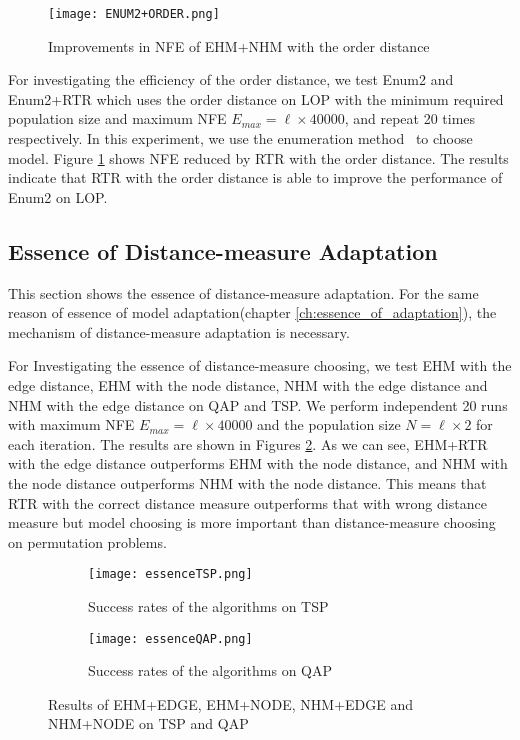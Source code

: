 \begin{figure}[htbp] 
        \centering
        \texttt{[image: ENUM2+ORDER.png]}
        \caption{ Improvements in NFE of EHM+NHM with the order distance } 
        \label{fig:enum2_imp}
\end{figure}


For investigating the efficiency of the order distance, we test Enum2 and Enum2+RTR which uses the order distance on LOP with the minimum required population size and maximum NFE $E_{max} = \ell\times 40000$, and repeat 20 times respectively. In this experiment, we use the enumeration method~\cite{riohsu2014} to choose model. Figure \ref{fig:enum2_imp} shows NFE reduced by RTR with the order distance. The results indicate that RTR with the order distance is able to improve the performance of Enum2 on LOP. 


\subsection{Essence of Distance-measure Adaptation}
This section shows the essence of distance-measure adaptation. For the same reason of essence of model adaptation(chapter \ref{ch:essence_of_adaptation}), the mechanism of distance-measure adaptation is necessary. 


For Investigating the essence of distance-measure choosing, we test EHM with the edge distance, EHM with the node distance, NHM with the edge distance and NHM with the edge distance on QAP and TSP. We perform independent 20 runs with maximum NFE $E_{max} = \ell \times 40000$ and the population size $N=\ell\times 2$ for each iteration. The results are shown in Figures \ref{fig:essence2}. As we can see, EHM+RTR with the edge distance outperforms EHM with the node distance, and NHM with the node distance outperforms NHM with the node distance. This means that RTR with the correct distance measure outperforms that with wrong distance measure but model choosing is more important than distance-measure choosing on permutation problems.

\begin{figure}[htbp] 
        \centering
        \begin{subfigure}{1\textwidth}
            \texttt{[image: essenceTSP.png]}
            \caption{  Success rates of the algorithms on TSP } 
        \end{subfigure}

        \begin{subfigure}{1\textwidth} 
            \texttt{[image: essenceQAP.png]}
            \caption{ Success rates of the algorithms on QAP}
        \end{subfigure}
        
        \caption{ Results of EHM+EDGE, EHM+NODE, NHM+EDGE and NHM+NODE on TSP and QAP } 
        \label{fig:essence2}
\end{figure}


